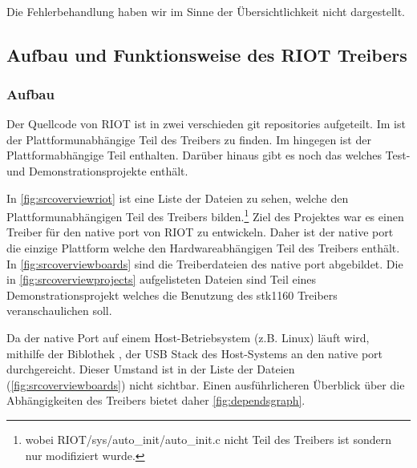 \paragraph{}
Die Fehlerbehandlung haben wir im Sinne der Übersichtlichkeit nicht dargestellt.


\subsection{Aufbau und Funktionsweise des RIOT Treibers}
\subsubsection{Aufbau}
Der Quellcode von RIOT \autocite{website:riotosgithub} ist in zwei verschieden git repositories aufgeteilt. Im 
\riotrepo{} ist der Plattformunabhängige Teil des Treibers zu finden. Im \boardsrepo{} hingegen ist der Plattformabhängige Teil enthalten. Darüber hinaus gibt es noch das \projectsrepo{} welches Test- und Demonstrationsprojekte enthält.

In \autoref{fig:srcoverviewriot} ist eine Liste der Dateien zu sehen, welche den Plattformunabhängigen Teil des Treibers bilden.\footnote{wobei RIOT/sys/auto\_init/auto\_init.c nicht Teil des Treibers ist sondern nur modifiziert wurde.} Ziel des Projektes war es einen Treiber für den native port von RIOT zu entwickeln. Daher ist der native port die einzige Plattform welche den Hardwareabhängigen Teil des Treibers enthält. In \autoref{fig:srcoverviewboards} sind die Treiberdateien des native port abgebildet. Die in \autoref{fig:srcoverviewprojects} aufgelisteten Dateien sind Teil eines Demonstrationsprojekt welches die Benutzung des stk1160 Treibers veranschaulichen soll. 

Da der native Port auf einem Host-Betriebsystem (z.B. Linux) läuft wird, mithilfe der Biblothek \libusb{} \autocite{website:libusbx}, der USB Stack des Host-Systems an den native port durchgereicht. Dieser Umstand ist in der Liste der Dateien (\autoref{fig:srcoverviewboards}) nicht sichtbar. Einen ausführlicheren Überblick über die Abhängigkeiten des Treibers bietet daher \autoref{fig:dependsgraph}.

